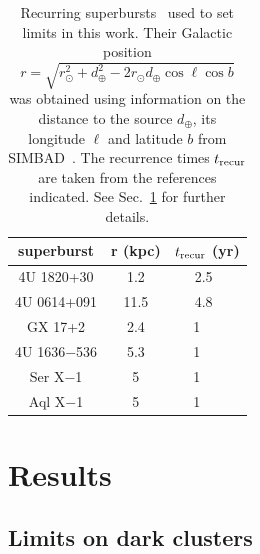 \documentclass[
    twocolumn,
	prd,
        amssymb,
	preprintnumbers,
	secnumarabic,
	nofootinbib,
	superscriptaddress]{revtex4-1}
\begin{document}
\begin{table}
    \centering
    \begin{tabular}{|c|c|c|}
    \hline
        superburst & r (kpc) & $t_{\rm recur}$ (yr)  \\
        \hline
     4U 1820+30  & 1.2 & 2.5~\cite{MACROSidhu2020} \\
      4U 0614+091   & 11.5  & 4.8~\cite{supburst:catalog2023} \\
         GX 17+2  & 2.4 & 1~~~\cite{supburst:catalog2023} \\
       4U 1636$-$536  & 5.3 & 1~~~\cite{supburst:trecur:CummingZandPage2005} \\
      Ser X$-$1  & 5 & 1~~~\cite{supburst:trecur:CummingZandPage2005} \\
       Aql X$-$1 & 5 & 1~~~\cite{supburst:trecur:CummingZandPage2005} \\
        \hline
    \end{tabular}
    \caption{Recurring superbursts~\cite{supburst:catalog2023} used to set limits in this work. 
    Their Galactic position $r = \sqrt{r^2_{\odot} + d^2_\oplus - 2 r_\odot d_\oplus \cos \ell \cos b}$ was obtained using information on the distance to the source $d_\oplus$, its longitude $\ell$ and latitude $b$ from SIMBAD~\cite{SIMBAD}. 
    The recurrence times $t_{\rm recur}$ are taken from the references indicated.
    See Sec.~\ref{sec:results} for further details.}
    \label{tab:superbs}
\end{table}


\section{Results}
\label{sec:results}

\subsection{Limits on dark clusters}
\label{subsec:limitsclumps}
\end{document}
